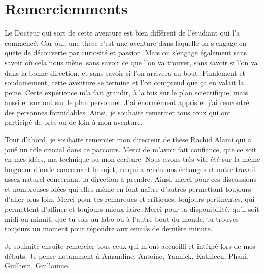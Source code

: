 \section*{Remerciemments}
 




Le Docteur qui sort de cette aventure est bien différent de l'étudiant qui l'a commencé. Car oui, une thèse c'est une aventure dans laquelle on s'engage en quête de découverte par curiosité et passion.
Mais on s'engage également sans savoir où cela nous mène, sans savoir ce que l'on va trouver, sans savoir si l'on va dans la bonne direction, et sans savoir si l'on arrivera au bout.
Finalement et soudainement, cette aventure se termine et l'on comprend que ça en valait la peine. 
Cette expérience m'a fait grandir, à la fois sur le plan scientifique, mais aussi et surtout sur le plan personnel.
J'ai énormément appris et j'ai rencontré des personnes formidables.
Ainsi, je souhaite remercier tous ceux qui ont participé de près ou de loin à mon aventure.

Tout d'abord, je souhaite remercier mon directeur de thèse Rachid Alami qui a joué un rôle crucial dans ce parcours.
Merci de m'avoir fait confiance, que ce soit en mes idées, ma technique ou mon écriture.
Nous avons très vite été sur la même longueur d'onde concernant le sujet, ce qui a rendu nos échanges et notre travail assez naturel concernant la direction à prendre.
Ainsi, merci pour ces discussions et nombreuses idées qui elles même en font naître d'autres permettant toujours d'aller plus loin. 
Merci pour tes remarques et critiques, toujours pertinentes, qui permettent d'affiner et toujours mieux faire.
Merci pour ta disponibilité, qu'il soit midi ou minuit, que tu sois au labo ou à l'autre bout du monde, tu trouves toujours un moment pour répondre aux emails de dernière minute.

Je souhaite ensuite remercier tous ceux qui m'ont accueilli et intégré lors de mes débuts. Je pense notamment à Amandine, Antoine, Yannick, Kathleen, Phani, Guilhem, Guillaume.

